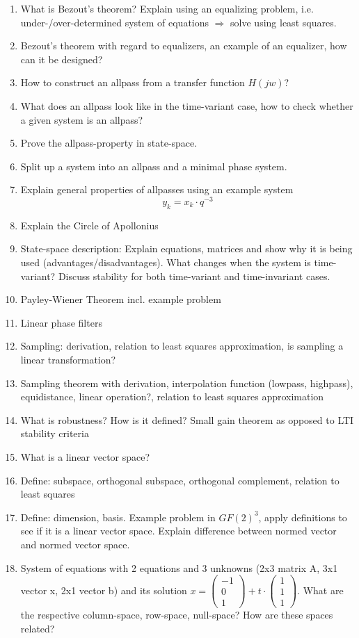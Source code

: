 \documentclass{article}
\newcommand{\icol}[1]{%
  \left(\begin{smallmatrix}#1\end{smallmatrix}\right)%
}
\begin{document}
\begin{enumerate}
    \item What is Bezout's theorem? Explain using an equalizing problem, i.e. under-/over-determined system of equations $\Rightarrow$ solve using least squares.
    \item Bezout's theorem with regard to equalizers, an example of an equalizer, how can it be designed?
    \item How to construct an allpass from a transfer function $H(jw)$?
    \item What does an allpass look like in the time-variant case, how to check whether a given system is an allpass?
    \item Prove the allpass-property in state-space.
    \item Split up a system into an allpass and a minimal phase system.
    \item Explain general properties of allpasses using an example system $$ y_k = x_k \cdot q^{-3} $$
    \item Explain the Circle of Apollonius
    \item State-space description: Explain equations, matrices and show why it is being used (advantages/disadvantages). What changes when the system is time-variant? Discuss stability for both time-variant and time-invariant cases. 
    \item Payley-Wiener Theorem incl. example problem
    \item Linear phase filters
    \item Sampling: derivation, relation to least squares approximation, is sampling a linear transformation?
    \item Sampling theorem with derivation, interpolation function (lowpass, highpass), equidistance, linear operation?, relation to least squares approximation
    \item What is robustness? How is it defined? Small gain theorem as opposed to LTI stability criteria
    \item What is a linear vector space?
    \item Define: subspace, orthogonal subspace, orthogonal complement, relation to least squares
    \item Define: dimension, basis. Example problem in $GF(2)^3$, apply definitions to see if it is a linear vector space. Explain difference between normed vector and normed vector space.
    \item System of equations with 2 equations and 3 unknowns (2x3 matrix A, 3x1 vector x, 2x1 vector b) and its solution $x=\icol{-1\\0\\1}+t\cdot \icol{1\\1\\1}$. What are the respective column-space, row-space, null-space? How are these spaces related?

\end{enumerate}
\end{document}
